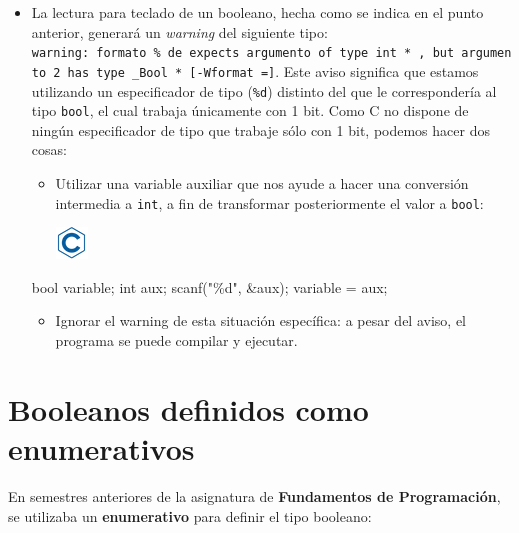\documentclass[
]{book}
\newenvironment{Shaded}{\begin{snugshade}}{\end{snugshade}}
\newcommand{\DataTypeTok}[1]{\textcolor[rgb]{0.13,0.29,0.53}{#1}}
\newcommand{\NormalTok}[1]{#1}
\newcommand{\StringTok}[1]{\textcolor[rgb]{0.31,0.60,0.02}{#1}}
\providecommand{\tightlist}{%
  \setlength{\itemsep}{0pt}\setlength{\parskip}{0pt}}
\begin{document}
\begin{itemize}
\tightlist
\item
  La lectura para teclado de un booleano, hecha como se indica en el punto anterior, generará un \emph{warning} del siguiente tipo: \texttt{warning:\ formato\ \textquotesingle{}\%\ de\ expects\ argumento\ of\ type\textquotesingle{}\ int\ *\ \textquotesingle{},\ but\ argumento\ 2\ has\ type\ \textquotesingle{}\_Bool\ *\textquotesingle{}\ {[}-Wformat\ ={]}}. Este aviso significa que estamos utilizando un especificador de tipo (\texttt{\%d}) distinto del que le correspondería al tipo \texttt{bool}, el cual trabaja únicamente con 1 bit. Como C no dispone de ningún especificador de tipo que trabaje sólo con 1 bit, podemos hacer dos cosas:

  \begin{itemize}
  \tightlist
  \item
    Utilizar una variable auxiliar que nos ayude a hacer una conversión intermedia a \texttt{int}, a fin de transformar posteriormente el valor a \texttt{bool}:

    \includegraphics{./img/c.png}
  \end{itemize}

\begin{Shaded}
\begin{Highlighting}[]
\DataTypeTok{bool}\NormalTok{ variable;}
\DataTypeTok{int}\NormalTok{ aux;}
\NormalTok{scanf(}\StringTok{"\%d"}\NormalTok{, \&aux);}
\NormalTok{variable = aux;}
\end{Highlighting}
\end{Shaded}

  \begin{itemize}
  \tightlist
  \item
    Ignorar el warning de esta situación específica: a pesar del aviso, el programa se puede compilar y ejecutar.
  \end{itemize}
\end{itemize}

\hypertarget{booleanos-definidos-como-enumerativos}{%
\section{Booleanos definidos como enumerativos}\label{booleanos-definidos-como-enumerativos}}

En semestres anteriores de la asignatura de \textbf{Fundamentos de Programación}, se utilizaba un \textbf{enumerativo} para definir el tipo booleano:
\end{document}
